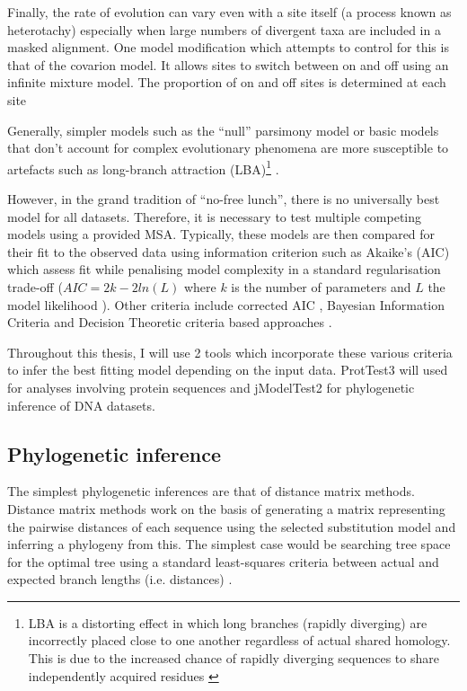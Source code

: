 Finally, the rate of evolution can vary even with a site itself (a process 
known as heterotachy) especially when large numbers of divergent taxa are included
in a masked alignment.  One model modification which attempts to control 
for this is that of the covarion model.  It allows sites to switch between
on and off using an infinite mixture model.  The proportion of on and off sites
is determined at each site \citep{Zhou2010} 



Generally, simpler models such as the ``null'' parsimony model or basic models
that don't account for complex evolutionary phenomena are more susceptible to
artefacts such as long-branch attraction (LBA)\footnote{
    LBA is a distorting effect in which long branches (rapidly diverging)
    are incorrectly placed close to one another regardless of actual shared
    homology.  This is due to the increased chance of rapidly diverging sequences
to share independently acquired residues \citep{Bergsten2005}}
\citep{Yang1996}.

However, in the grand tradition of
``no-free lunch'', there is no universally best model for all datasets.
Therefore, it is necessary to test multiple competing models using a provided
MSA.  Typically, these models are then compared for their fit to the observed
data using information criterion \citep{Sullivan2005} such as Akaike's (AIC) which assess
fit while penalising model complexity in a standard regularisation trade-off 
(\(AIC=2k-2ln(L)\) where \(k\) is the number of parameters and \(L\) the 
model likelihood \citep{Akaike1974}).  Other criteria include corrected AIC \citep{sugiura1978further},
Bayesian Information Criteria \citep{Schwarz1978} and Decision Theoretic criteria \citep{Minin2003} 
based approaches \citep{Sullivan2005}.

Throughout this thesis, I will use 2 tools which incorporate these various criteria
to infer the best fitting model depending on the input data. 
ProtTest3 \citep{Abascal2005,Darriba2011a} will used for analyses 
involving protein sequences and jModelTest2 \citep{Posada2008,Darriba2012} for
phylogenetic inference of DNA datasets.

\subsection{Phylogenetic inference}

The simplest phylogenetic inferences are that of distance matrix methods.
Distance matrix methods \citep{Fitch1967} work on the basis of generating 
a matrix representing the pairwise distances of each sequence using the selected
substitution model and inferring a phylogeny from this.  The simplest case
would be searching tree space for the optimal tree using a standard least-squares
criteria between actual and expected branch lengths (i.e. distances) \citep{Fitch1967,Cavalli-Sforza1967}.


